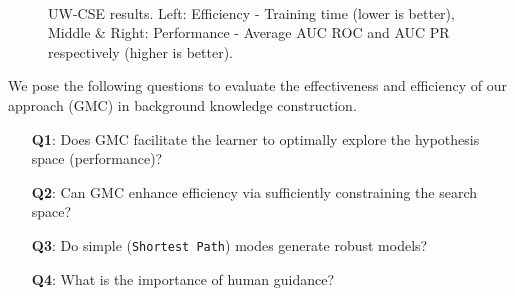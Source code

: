 \documentclass[sigconf]{acmart}
\begin{document}
\begin{figure}[t]
%
%
%
\\
%
\caption{UW-CSE results. Left: Efficiency - Training time (lower is better), Middle \& Right: Performance - Average AUC ROC and AUC PR respectively (higher is better).}
\label{fig:results3}
\end{figure}

We pose the following questions to evaluate the effectiveness and efficiency of our approach (\textsc{GMC}) in background knowledge construction.
\begin{enumerate}
\item[\textbf{Q1}:] Does \textsc{GMC} facilitate the learner to optimally explore the hypothesis space (performance)?
\item[\textbf{Q2}:] Can \textsc{GMC} enhance efficiency via sufficiently constraining the search space?
\item[\textbf{Q3}:] Do simple (\texttt{Shortest Path}) modes generate robust models? 
\item[\textbf{Q4}:] {What is the importance of human guidance?}
\end{enumerate}
\end{document}
